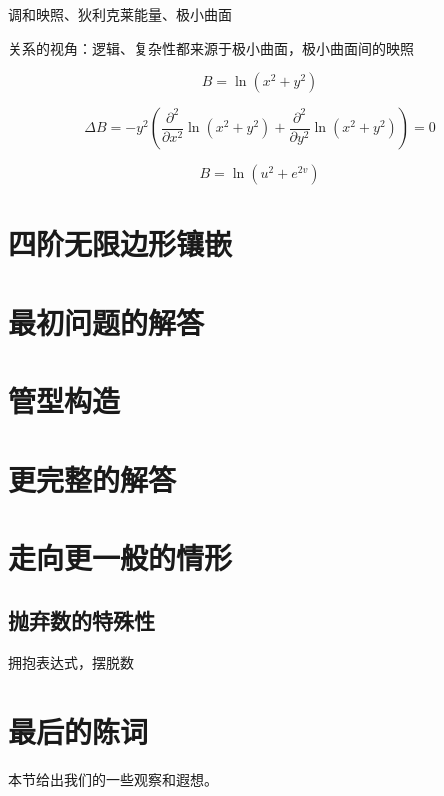 \documentclass[a4paper,12pt]{article}
\numberwithin{definition}{section}
\numberwithin{lemma}{section}
\numberwithin{proposition}{section}
\numberwithin{theorem}{section}
\numberwithin{grammar}{section}
\numberwithin{program}{section}
\numberwithin{convention}{section}
\numberwithin{corollary}{section}
\begin{document}
调和映照、狄利克莱能量、极小曲面

关系的视角：逻辑、复杂性都来源于极小曲面，极小曲面间的映照

\begin{equation}
   B  = \ln (x^2+ y^2)
\end{equation}

\begin{equation}
\Delta B = - y^2 (\frac{\partial^2}{\partial x^2} \ln (x^2+ y^2) + \frac{\partial^2}{\partial y^2} \ln (x^2+ y^2)) = 0
\end{equation}


\begin{equation}
   B  = \ln (u^2+ e^{2v})
\end{equation}

\newpage

\section{四阶无限边形镶嵌}

\section{最初问题的解答}

\section{管型构造}

\section{更完整的解答}

\section{走向更一般的情形}

\subsection{抛弃数的特殊性}

拥抱表达式，摆脱数

\newpage

\section{最后的陈词}

本节给出我们的一些观察和遐想。
\end{document}
